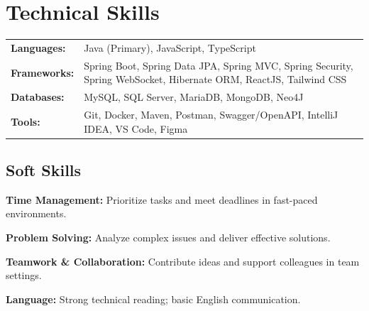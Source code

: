 \section{Technical Skills}

\begin{tabularx}{\textwidth}{@{} >{\bfseries}l X @{}}
    Languages:   & Java (Primary), JavaScript, TypeScript \\[3pt]
    Frameworks:  & Spring Boot, Spring Data JPA, Spring MVC, Spring Security, Spring WebSocket, Hibernate ORM, ReactJS, Tailwind CSS \\[3pt]
    Databases:   & MySQL, SQL Server, MariaDB, MongoDB, Neo4J \\[3pt]
    Tools:       & Git, Docker, Maven, Postman, Swagger/OpenAPI, IntelliJ IDEA, VS Code, Figma \\[3pt]
\end{tabularx}

\vspace{6pt}

\subsection*{\normalsize Soft Skills}
\begin{entryItems}
    \item \textbf{Time Management:} Prioritize tasks and meet deadlines in fast-paced environments.
    \item \textbf{Problem Solving:} Analyze complex issues and deliver effective solutions.
    \item \textbf{Teamwork \& Collaboration:} Contribute ideas and support colleagues in team settings.
    \item \textbf{Language:} Strong technical reading; basic English communication.
\end{entryItems}
